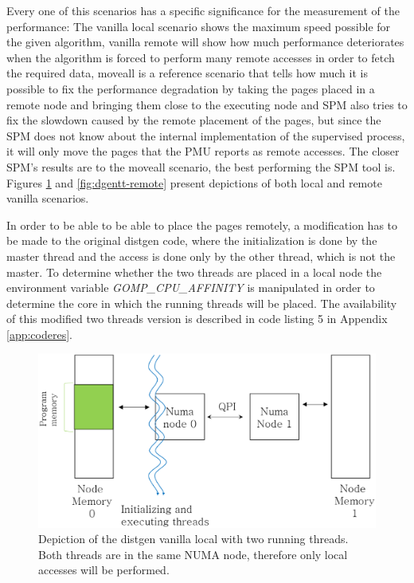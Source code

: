 Every one of this scenarios has a specific significance for the measurement of the performance: The vanilla local scenario shows the maximum speed possible for the given algorithm, vanilla remote will show how much performance deteriorates when the algorithm is forced to perform many remote accesses in order to fetch the required data, moveall is a reference scenario that tells how much it is possible to fix the performance degradation by taking the pages placed in a remote node and bringing them close to the executing node and SPM also tries to fix the slowdown caused by the remote placement of the pages, but since the SPM does not know about the internal implementation of the supervised process, it will only move the pages that the PMU reports as remote accesses. The closer SPM's results are to the moveall scenario, the best performing the SPM tool is. Figures \ref{fig:dgentt-local} and \ref{fig:dgentt-remote} present depictions of both local and remote vanilla scenarios.

In order to be able to be able to place the pages remotely, a modification has to be made to the original distgen code, where the initialization is done by the master thread and the access is done only by the other thread, which is not the master. To determine whether the two threads are placed in a local node the environment variable \textit{GOMP\_CPU\_AFFINITY} is manipulated in order to determine the core in which the running threads will be placed. The availability of this modified two threads version is described in code listing 5 in Appendix \ref{app:coderes}.

\begin{figure}
	\centering
		\includegraphics[width=.7\textwidth]{figures/distgentt-local.eps}
		\caption[Depiction of the working of the distgen vanilla local scenario with two threads]{Depiction of the distgen vanilla local with two running threads. Both threads are in the same NUMA node, therefore only local accesses will be performed.}
		\label{fig:dgentt-local}
\end{figure}

